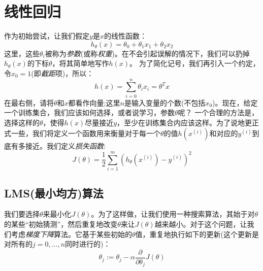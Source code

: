 \section{线性回归}
作为初始尝试，让我们假定$y$是$x$的线性函数：
\begin{equation*}
h_\theta(x) = \theta_0 + \theta_1x_1 + \theta_2x_2
\end{equation*}
这里，这些$\theta_i$被称为\emph{参数}(或称\emph{权重})。在不会引起误解的情况下，我们可以扔掉$h_\theta(x)$的下标$\theta$，将其简单地写作$h(x)$。
为了简化记号，我们再引入一个约定，令$x_0 = 1$(即\emph{截距}项)，所以：
\begin{equation}
h(x) = \sum_{i = 0}^n\theta_ix_i = \theta^Tx
\end{equation}
在最右侧，请将$\theta$和$x$都看作向量;这里$n$是输入变量的个数(不包括$x_0$)。现在，给定一个训练集合，我们应该如何选择，或者说学习，参数$\theta$呢？
一个合理的方法是，选择这样的$\theta$，使得$h(x)$尽量接近$y$，至少在训练集合内应该这样。为了说地更正式一些，我们将定义一个函数用来衡量对于每一个$\theta$的值$h(x^{(i)})$和对应的$y^{(i)}$到底有多接近。我们定义\emph{损失函数}:
\begin{equation}
J(\theta) = \frac{1}{2}\sum^m_{i = 1}(h_\theta(x^{(i)}) - y^{(i)})^2
\end{equation}

\subsection{LMS(最小均方)算法}
我们要选择$\theta$来最小化$J(\theta)$。为了这样做，让我们使用一种搜索算法，其始于对$\theta$的某些“初始猜测”，然后重复地改变$\theta$来让$J(\theta)$越来越小。对于这个问题，让我们考虑\emph{梯度下降}算法。它基于某些初始的$\theta$值，重复地执行如下的更新(这个更新是对所有的$j = 0,\dots,n$同时进行的)：
\begin{equation*}
\theta_j := \theta_j - \alpha\frac{\partial}{\partial\theta_j}J(\theta)
\end{equation*}

